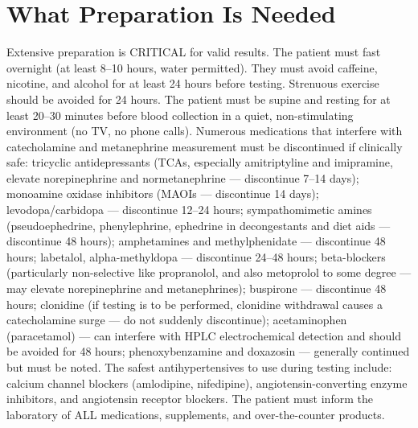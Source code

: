 \section*{What Preparation Is Needed}
Extensive preparation is CRITICAL for valid results. The patient must fast overnight (at least 8--10 hours, water permitted). They must avoid caffeine, nicotine, and alcohol for at least 24 hours before testing. Strenuous exercise should be avoided for 24 hours. The patient must be supine and resting for at least 20--30 minutes before blood collection in a quiet, non-stimulating environment (no TV, no phone calls). Numerous medications that interfere with catecholamine and metanephrine measurement must be discontinued if clinically safe: tricyclic antidepressants (TCAs, especially amitriptyline and imipramine, elevate norepinephrine and normetanephrine --- discontinue 7--14 days); monoamine oxidase inhibitors (MAOIs --- discontinue 14 days); levodopa/carbidopa --- discontinue 12--24 hours; sympathomimetic amines (pseudoephedrine, phenylephrine, ephedrine in decongestants and diet aids --- discontinue 48 hours); amphetamines and methylphenidate --- discontinue 48 hours; labetalol, alpha-methyldopa --- discontinue 24--48 hours; beta-blockers (particularly non-selective like propranolol, and also metoprolol to some degree --- may elevate norepinephrine and metanephrines); buspirone --- discontinue 48 hours; clonidine (if testing is to be performed, clonidine withdrawal causes a catecholamine surge --- do not suddenly discontinue); acetaminophen (paracetamol) --- can interfere with HPLC electrochemical detection and should be avoided for 48 hours; phenoxybenzamine and doxazosin --- generally continued but must be noted. The safest antihypertensives to use during testing include: calcium channel blockers (amlodipine, nifedipine), angiotensin-converting enzyme inhibitors, and angiotensin receptor blockers. The patient must inform the laboratory of ALL medications, supplements, and over-the-counter products.

